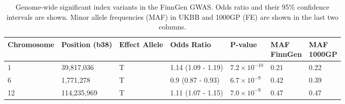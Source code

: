 \begin{table}[htb]
  \centering\begingroup\fontsize{10}{12}\selectfont
  \caption[pAD-associated variants from the downloaded FinnGen GWAS summary statistics]{Genome-wide significant index variants in the FinnGen GWAS. Odds ratio and their 95\% confidence intervals are shown. Minor allele frequencies (MAF) in UKBB and 1000GP (FE) are shown in the last two columns.}
  \label{table:gws_finngen}
  \begin{tabular}[t]{|l|l|l|l|l|l|l|}
  \hline
  Chromosome & Position (b38) & Effect Allele & Odds Ratio & P-value & \makecell{MAF\\ FinnGen} & \makecell{MAF\\ 1000GP}\\
  \hline
  1 & 39,817,036 & T & 1.14 (1.09 - 1.19) & $7.2\times10^{-10}$ & 0.21 & 0.22\\
  \hline
  6 & 1,771,278 & T & 0.9 (0.87 - 0.93) & $6.7\times10^{-9}$ & 0.42 & 0.39\\
  \hline
  12 & 114,235,969 & T & 1.11 (1.07 - 1.15) & $7.0\times10^{-9}$ & 0.47 & 0.47\\
  \hline
  \end{tabular}
  \endgroup{}
  \end{table}

